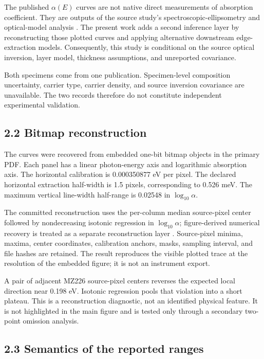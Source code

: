 The published \(\alpha(E)\) curves are not native direct measurements of
absorption coefficient. They are outputs of the source study's
spectroscopic-ellipsometry and optical-model analysis
\citep{Moazzami2005, GarciaCaurel2013}. The present work adds a second
inference layer by reconstructing those plotted curves and applying
alternative downstream edge-extraction models. Consequently, this study
is conditional on the source optical inversion, layer model, thickness
assumptions, and unreported covariance.

Both specimens come from one publication. Specimen-level composition
uncertainty, carrier type, carrier density, and source inversion
covariance are unavailable. The two records therefore do not constitute
independent experimental validation.

\subsection{2.2 Bitmap reconstruction}\label{bitmap-reconstruction}

The curves were recovered from embedded one-bit bitmap objects in the
primary PDF. Each panel has a linear photon-energy axis and logarithmic
absorption axis. The horizontal calibration is 0.000350877 eV per pixel.
The declared horizontal extraction half-width is 1.5 pixels,
corresponding to 0.526 meV. The maximum vertical line-width half-range
is 0.02548 in \(\log_{10}\alpha\).

The committed reconstruction uses the per-column median source-pixel
center followed by nondecreasing isotonic regression in
\(\log_{10}\alpha\); figure-derived numerical recovery is treated as a
separate reconstruction layer \citep{Burda2017}. Source-pixel minima,
maxima, center coordinates, calibration anchors, masks, sampling
interval, and file hashes are retained. The result reproduces the
visible plotted trace at the resolution of the embedded figure; it is
not an instrument export.

A pair of adjacent MZ226 source-pixel centers reverses the expected
local direction near 0.198 eV. Isotonic regression pools that violation
into a short plateau. This is a reconstruction diagnostic, not an
identified physical feature. It is not highlighted in the main figure
and is tested only through a secondary two-point omission analysis.

\subsection{2.3 Semantics of the reported
ranges}\label{semantics-of-the-reported-ranges}

